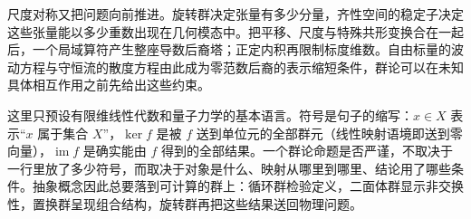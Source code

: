 尺度对称又把问题向前推进。旋转群决定张量有多少分量，齐性空间的稳定子决定这些张量能以多少重数出现在几何模态中。把平移、尺度与特殊共形变换合在一起后，一个局域算符产生整座导数后裔塔；正定内积再限制标度维数。自由标量的波动方程与守恒流的散度方程由此成为零范数后裔的表示缩短条件，群论可以在未知具体相互作用之前先给出这些约束。

这里只预设有限维线性代数和量子力学的基本语言。符号是句子的缩写：\(x\in X\) 表示“\(x\) 属于集合 \(X\)”，\(\ker f\) 是被 \(f\) 送到单位元的全部群元（线性映射语境即送到零向量），\(\operatorname{im}f\) 是确实能由 \(f\) 得到的全部结果。一个群论命题是否严谨，不取决于一行里放了多少符号，而取决于对象是什么、映射从哪里到哪里、结论用了哪些条件。抽象概念因此总要落到可计算的群上：循环群检验定义，二面体群显示非交换性，置换群呈现组合结构，旋转群再把这些结果送回物理问题。
